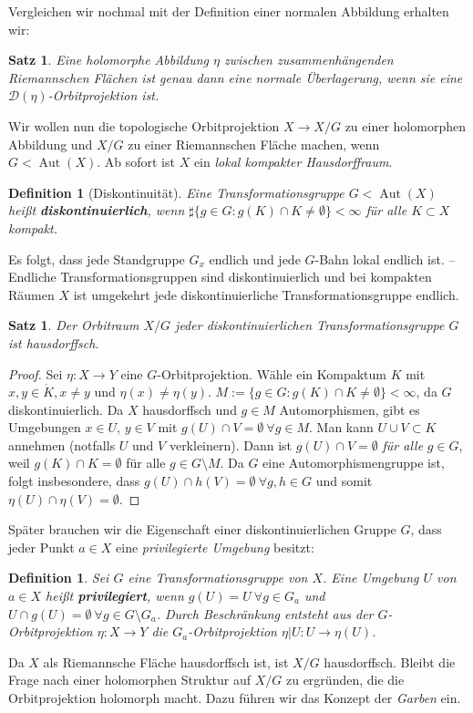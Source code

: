 \documentclass[12pt,a4paper]{article}
\theoremstyle{plain}
\newtheorem{Satz}[Theorem]{Satz}
\newtheorem{Definition}[Theorem]{Definition}
\newcommand{\herv}[1]{{\emph{\textbf{#1}}}}
\numberwithin{equation}{section}
\begin{document}
Vergleichen wir nochmal mit der Definition einer normalen Abbildung erhalten wir:
\begin{Satz} Eine holomorphe Abbildung $\eta$ zwischen zusammenhängenden Riemannschen Flächen ist genau dann eine normale Überlagerung, wenn sie eine $\mathcal{D}(\eta)$-Orbitprojektion ist.
\end{Satz}
Wir wollen nun die topologische Orbitprojektion $X\rightarrow X/G$ zu einer holomorphen Abbildung und $X/G$ zu einer Riemannschen Fläche machen, wenn $G<\operatorname{Aut}(X)$. Ab sofort ist $X$ ein \emph{lokal kompakter Hausdorffraum}.
\begin{Definition}[Diskontinuität] Eine Transformationsgruppe $G<\operatorname{Aut}(X)$ heißt \herv{diskontinuierlich}, wenn $\sharp\{g\in G: g(K)\cap K \neq \emptyset \}<\infty$ für alle $K\subset X$ kompakt.
\end{Definition}
Es folgt, dass jede Standgruppe $G_x$ endlich und jede $G$-Bahn lokal endlich ist. -- Endliche Transformationsgruppen sind diskontinuierlich und bei kompakten Räumen $X$ ist umgekehrt jede diskontinuierliche Transformationsgruppe endlich.
\begin{Satz} Der Orbitraum $X/G$ jeder diskontinuierlichen Transformationsgruppe $G$ ist hausdorffsch.
\end{Satz}
\begin{proof}
Sei $\eta: X\rightarrow Y$ eine $G$-Orbitprojektion. Wähle ein Kompaktum $K$ mit $x,y\in \mathring{K}, x\neq y$ und $\eta(x)\neq \eta(y)$. $M:=\{g\in G: g(K)\cap K\neq \emptyset \}<\infty$, da $G$ diskontinuierlich. Da $X$ hausdorffsch und $g\in M$ Automorphismen, gibt es Umgebungen $x\in U$, $y\in V$ mit $g(U)\cap V = \emptyset\ \forall g\in M$. Man kann $U\cup V \subset K$ annehmen (notfalls $U$ und $V$ verkleinern). Dann ist $g(U)\cap V = \emptyset$ \emph{für alle} $g\in G$, weil $g(K)\cap K = \emptyset$ für alle $g\in G\setminus M$. Da $G$ eine Automorphismengruppe ist, folgt insbesondere, dass $g(U)\cap h(V) = \emptyset \ \forall g,h \in G$ und somit $\eta(U) \cap \eta(V) = \emptyset$.
\end{proof}
Später brauchen wir die Eigenschaft einer diskontinuierlichen Gruppe $G$, dass jeder Punkt $a\in X$ eine \emph{privilegierte Umgebung} besitzt:
\begin{Definition} Sei $G$ eine Transformationsgruppe von $X$. Eine Umgebung $U$ von $a\in X$ heißt \herv{privilegiert}, wenn $g(U)=U\ \forall g\in G_a$ und $U \cap g(U) = \emptyset\ \forall g\in G\setminus G_a$. Durch Beschränkung entsteht aus der $G$-Orbitprojektion $\eta:X\rightarrow Y$ die $G_a$-Orbitprojektion $\eta|U : U\rightarrow \eta (U)$.
\end{Definition}
Da $X$ als Riemannsche Fläche hausdorffsch ist, ist $X/G$ hausdorffsch. Bleibt die Frage nach einer holomorphen Struktur auf $X/G$ zu ergründen, die die Orbitprojektion holomorph macht. Dazu führen wir das Konzept der \emph{Garben} ein.
\end{document}
